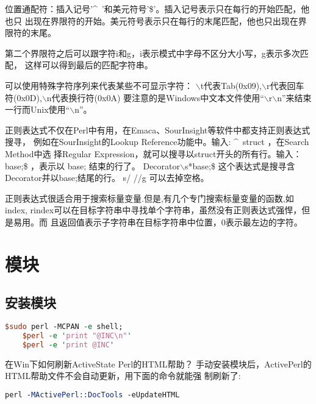 \documentclass[a4paper,11pt]{book}
\begin{document}
位置通配符：插入记号'\^~'和美元符号'\$'。插入记号表示只在每行的开始匹配，他也只
出现在界限符的开始。美元符号表示只在每行的末尾匹配，他也只出现在界限符的末尾。

第二个界限符之后可以跟字符i和g，i表示模式中字母不区分大小写，g表示多次匹配，
这样可以得到最后的匹配字符串。

可以使用特殊字符序列来代表某些不可显示字符：
$\backslash$t代表Tab(0x09),$\backslash$r代表回车符(0x0D),$\backslash$n代表换行符(0x0A)
要注意的是Windows中文本文件使用“$\backslash$r$\backslash$n”来结束一行而Unix使用“$\backslash$n”。

正则表达式不仅在Perl中有用，在Emaca、SourInsight等软件中都支持正则表达式搜寻，
例如在SourInsight的Lookup Reference功能中。输入: \^~struct ，在Search Method中选
择Regular Expression，就可以搜寻以struct开头的所有行。输入：base;\$ ，表示以 
base; 结束的行了。
Decorator$\backslash$s*base;\$   这个表达式是搜寻含Decorator并以base;结尾的行。
s/ //g  可以去掉空格。

正则表达式很适合用于搜索标量变量.但是,有几个专门搜索标量变量的函数,如index, 
rindex可以在目标字符串中寻找单个字符串，虽然没有正则表达式强悍，但是易用。而
且返回值表示子字符串在目标字符串中位置，0表示最左边的字符。




\section{模块}
\subsection{安装模块}
\begin{lstlisting}[language=perl]
    $sudo perl -MCPAN -e shell;
    $perl -e 'print "@INC\n"' 
    $perl -e 'print @INC'
\end{lstlisting}

在Win下如何刷新ActiveState Perl的HTML帮助？
    手动安装模块后，ActivePerl的HTML帮助文件不会自动更新，用下面的命令就能强
制刷新了:
\begin{lstlisting}[language=perl]
perl -MActivePerl::DocTools -eUpdateHTML
\end{lstlisting}
\end{document}
